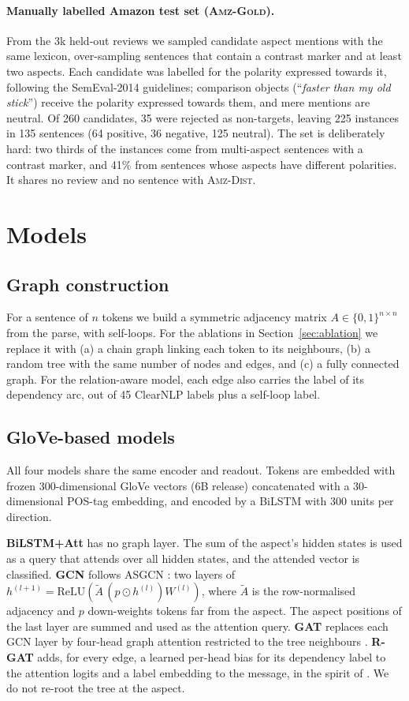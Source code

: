 \documentclass[11pt]{article}
\newcommand{\gold}{\textsc{Amz-Gold}}
\newcommand{\dist}{\textsc{Amz-Dist}}
\begin{document}
\paragraph{Manually labelled Amazon test set (\gold).} From the 3k held-out reviews we sampled candidate aspect mentions with the same lexicon, over-sampling sentences that contain a contrast marker and at least two aspects. Each candidate was labelled for the polarity expressed towards it, following the SemEval-2014 guidelines; comparison objects (``\textit{faster than my old stick}'') receive the polarity expressed towards them, and mere mentions are neutral. Of 260 candidates, 35 were rejected as non-targets, leaving 225 instances in 135 sentences (64 positive, 36 negative, 125 neutral). The set is deliberately hard: two thirds of the instances come from multi-aspect sentences with a contrast marker, and 41\% from sentences whose aspects have different polarities. It shares no review and no sentence with \dist.

\section{Models}
\label{sec:models}

\subsection{Graph construction}
For a sentence of $n$ tokens we build a symmetric adjacency matrix $A \in \{0,1\}^{n \times n}$ from the parse, with self-loops. For the ablations in Section~\ref{sec:ablation} we replace it with (a) a chain graph linking each token to its neighbours, (b) a random tree with the same number of nodes and edges, and (c) a fully connected graph. For the relation-aware model, each edge also carries the label of its dependency arc, out of 45 ClearNLP labels plus a self-loop label.

\subsection{GloVe-based models}
All four models share the same encoder and readout. Tokens are embedded with frozen 300-dimensional GloVe vectors \citep{pennington-etal-2014-glove} (6B release) concatenated with a 30-dimensional POS-tag embedding, and encoded by a BiLSTM with 300 units per direction.

\textbf{BiLSTM+Att} has no graph layer. The sum of the aspect's hidden states is used as a query that attends over all hidden states, and the attended vector is classified.
\textbf{GCN} follows ASGCN \citep{zhang-etal-2019-aspect}: two layers of $h^{(l+1)} = \mathrm{ReLU}(\tilde{A}\, (p \odot h^{(l)}) W^{(l)})$, where $\tilde{A}$ is the row-normalised adjacency and $p$ down-weights tokens far from the aspect. The aspect positions of the last layer are summed and used as the attention query.
\textbf{GAT} replaces each GCN layer by four-head graph attention restricted to the tree neighbours \citep{velickovic2018graph}.
\textbf{R-GAT} adds, for every edge, a learned per-head bias for its dependency label to the attention logits and a label embedding to the message, in the spirit of \citet{wang-etal-2020-relational}. We do not re-root the tree at the aspect.
\end{document}
